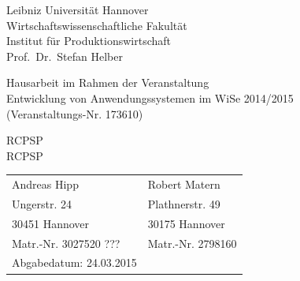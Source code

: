 \documentclass[a4paper,12pt,parskip,bibtotoc,liststotoc]{article}
\begin{document}
%
%
\thispagestyle{empty}  %
Leibniz Universität Hannover\\
Wirtschaftswissenschaftliche Fakultät\\
Institut für Produktionswirtschaft\\
Prof.\ Dr.\ Stefan Helber

\vspace{5cm}

\begin{center}
Hausarbeit im Rahmen der Veranstaltung \\
Entwicklung von Anwendungssystemen  im WiSe 2014/2015 \\
(Veranstaltungs-Nr. 173610)

\vspace{2.5cm}

{\Large RCPSP \\
RCPSP}
\end{center}

\vspace{5.5cm}


\begin{table}[h!]
    \vspace*{-3mm}
    \hspace*{2mm}
  \renewcommand{\arraystretch}{1,5}
    \begin{tabular}{ll}
Andreas Hipp &Robert Matern \\
Ungerstr. 24&Plathnerstr. 49 \\
30451 Hannover&30175 Hannover \\
Matr.-Nr. 3027520 ???&Matr.-Nr. 2798160 \\[3mm]
Abgabedatum: 24.03.2015
	\end{tabular}
\end{table}

\newpage

\tableofcontents

\newpage  %

\listoffigures
\end{document}
